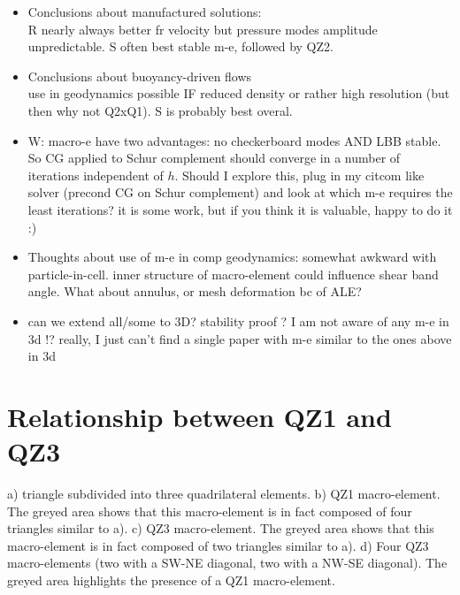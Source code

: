 \documentclass[a4paper,12pt]{article}
\begin{document}
\begin{itemize}
\item Conclusions about manufactured solutions:\\
R nearly always better fr velocity but pressure modes amplitude unpredictable.
S often best stable m-e, followed by QZ2.

\item Conclusions about buoyancy-driven flows\\
use in geodynamics possible IF reduced density or rather high resolution (but then why not Q2xQ1). 
S is probably best overal.

\item
W: macro-e have two advantages: no checkerboard modes AND LBB stable. 
So CG applied to Schur complement should converge in a number of iterations independent of $h$.
Should I explore this, plug in my citcom like solver (precond CG on Schur complement)
and look at which m-e requires the least iterations? it is some work, but if you think
it is valuable, happy to do it :)

\item 
Thoughts about use of m-e in comp geodynamics: 
somewhat awkward with particle-in-cell. inner structure of macro-element could influence shear band angle. 
What about annulus, or mesh deformation bc of ALE?

\item can we extend all/some to 3D? stability proof ? I am not aware of any m-e in 3d !?
really, I just can't find a single paper with m-e similar to the ones above in 3d

\end{itemize}







\printbibliography

\appendix

\section{Relationship between QZ1 and QZ3}



a) triangle subdivided into three quadrilateral elements.
b) QZ1 macro-element. The greyed area shows that this macro-element is 
in fact composed of four triangles similar to a).
c) QZ3 macro-element. The greyed area shows that this macro-element is
in fact composed of two triangles similar to a).
d) Four QZ3 macro-elements (two with a SW-NE diagonal, two with a NW-SE diagonal).
The greyed area highlights the presence of a QZ1 macro-element. 
\end{document}
